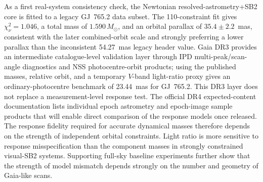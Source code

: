 \documentclass[referee]{raa}
\begin{document}
{As a first real-system consistency check, the Newtonian resolved-astrometry+SB2 core is fitted to a legacy GJ~765.2 data subset. The 110-constraint fit gives $\chi^2_\nu=1.046$, a total mass of $1.590\,M_\odot$, and an orbital parallax of $35.4\pm2.2$~mas, consistent with the later combined-orbit scale and strongly preferring a lower parallax than the inconsistent 54.27~mas legacy header value. Gaia DR3 provides an intermediate catalogue-level validation layer through IPD multi-peak/scan-angle diagnostics and NSS photocentre-orbit products; using the published masses, relative orbit, and a temporary $V$-band light-ratio proxy gives an ordinary-photocentre benchmark of 23.44~mas for GJ~765.2. This DR3 layer does not replace a measurement-level response test. The official DR4 expected-content documentation lists individual epoch astrometry and epoch-image sample products that will enable direct comparison of the response models once released.
The response fidelity required for accurate dynamical masses therefore depends on the strength of independent orbital constraints. Light ratio is more sensitive to response misspecification than the component masses in strongly constrained visual-SB2 systems. Supporting full-sky baseline experiments further show that the strength of model mismatch depends strongly on the number and geometry of Gaia-like scans.
}

\maketitle













\label{lastpage}
\end{document}
